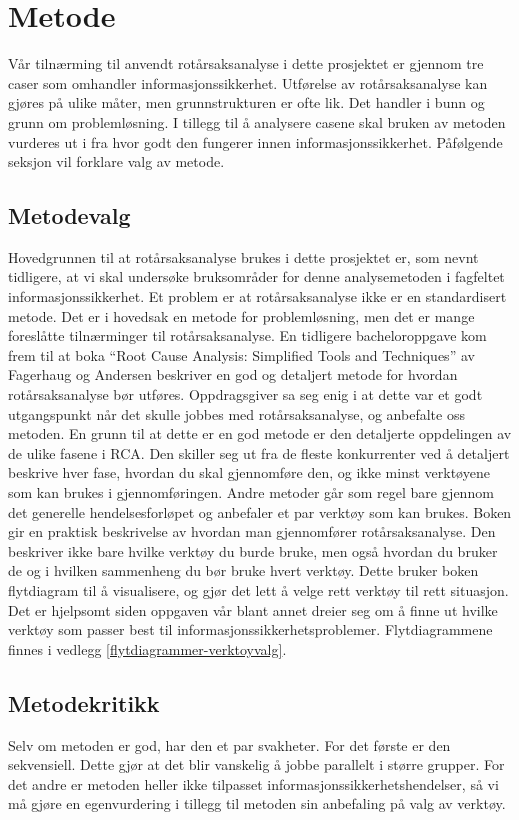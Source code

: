 \chapter{Metode}
\label{kap:metode}
Vår tilnærming til anvendt rotårsaksanalyse i dette prosjektet er gjennom tre caser som omhandler informasjonssikkerhet. Utførelse av rotårsaksanalyse kan gjøres på ulike måter, men grunnstrukturen er ofte lik. Det handler i bunn og grunn om problemløsning. I tillegg til å analysere casene skal bruken av metoden vurderes ut i fra hvor godt den fungerer innen informasjonssikkerhet. Påfølgende seksjon vil forklare valg av metode. 

\section{Metodevalg}
Hovedgrunnen til at rotårsaksanalyse brukes i dette prosjektet er, som nevnt tidligere, at vi skal undersøke bruksområder for denne analysemetoden i fagfeltet informasjonssikkerhet. Et problem er at rotårsaksanalyse ikke er en standardisert metode. Det er i hovedsak en metode for problemløsning, men det er mange foreslåtte tilnærminger til rotårsaksanalyse. En tidligere bacheloroppgave \cite{RCARapport} kom frem til at boka ``Root Cause Analysis: Simplified Tools and Techniques'' av Fagerhaug og Andersen \cite{RCA} beskriver en god og detaljert metode for hvordan rotårsaksanalyse bør utføres. Oppdragsgiver sa seg enig i at dette var et godt utgangspunkt når det skulle jobbes med rotårsaksanalyse, og anbefalte oss metoden. En grunn til at dette er en god metode er den detaljerte oppdelingen av de ulike fasene i RCA. Den skiller seg ut fra de fleste konkurrenter ved å detaljert beskrive hver fase, hvordan du skal gjennomføre den, og ikke minst verktøyene som kan brukes i gjennomføringen. Andre metoder går som regel bare gjennom det generelle hendelsesforløpet og anbefaler et par verktøy som kan brukes. Boken gir en praktisk beskrivelse av hvordan man gjennomfører rotårsaksanalyse. Den beskriver ikke bare hvilke verktøy du burde bruke, men også hvordan du bruker de og i hvilken sammenheng du bør bruke hvert verktøy. Dette bruker boken flytdiagram til å visualisere, og gjør det lett å velge rett verktøy til rett situasjon. Det er hjelpsomt siden oppgaven vår blant annet dreier seg om å finne ut hvilke verktøy som passer best til informasjonssikkerhetsproblemer. Flytdiagrammene finnes i vedlegg \ref{flytdiagrammer-verktoyvalg}.

\section{Metodekritikk}
Selv om metoden er god, har den et par svakheter. For det første er den sekvensiell. Dette gjør at det blir vanskelig å jobbe parallelt i større grupper. For det andre er metoden heller ikke tilpasset informasjonssikkerhetshendelser, så vi må gjøre en egenvurdering i tillegg til metoden sin anbefaling på valg av verktøy. 